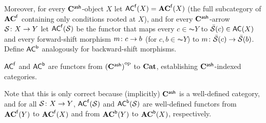 Moreover, for every $\mathbf{C}^{\mathsf{ash}}$-object $X$ let $\mathsf{AC}^{\mathsf{f}}(X)=\mathbf{AC}^{\mathsf{f}}(X)$ (the full subcategory of $\mathbf{AC}^{\mathsf{f}}$ containing only conditions rooted at $X$), and for every $\mathbf{C}^{\mathsf{ash}}$-arrow $\mathcal{S}\colon X\rightarrow Y$ let $\mathsf{AC}^{\mathsf{f}}(\mathcal{S})$ be the functor that maps every $c\in \AC Y$ to $\bar\cS(c)\in \AC X$ and every forward-shift morphism $m\colon c\rightarrow b$ (for $c,b\in \AC Y$) to $m\colon \bar{\mathcal{S}}(c)\rightarrow \bar{\mathcal{S}}(b)$. Define $\mathsf{AC}^{\mathsf{b}}$ analogously for backward-shift morphisms.

\begin{proposition}
$\mathsf{AC}^{\mathsf{f}}$ and $\mathsf{AC}^{\mathsf{b}}$ are functors from ${(\mathbf{C}^{\mathsf{ash}})}^{\mathrm{op}}$ to $\mathbf{Cat}$, establishing $\mathbf{C}^{\mathsf{ash}}$-indexed categories.
\end{proposition}
%
Note that this is only correct because (implicitly) $\mathbf{C}^{\mathsf{ash}}$ is a well-defined category, and for all $\mathcal{S}\colon X\rightarrow Y$, $\mathsf{AC}^{\mathsf{f}}(\mathcal{S})$ and $\mathsf{AC}^{\mathsf{b}}(\mathcal{S})$ are well-defined functors from $\mathbf{AC}^{\mathsf{f}}(Y)$ to $\mathbf{AC}^{\mathsf{f}}(X)$ and from $\mathbf{AC}^{\mathsf{b}}(Y)$ to $\mathbf{AC}^{\mathsf{b}}(X)$, respectively.
